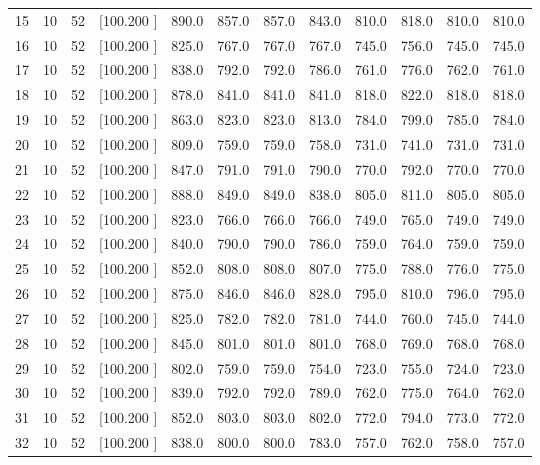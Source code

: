 \documentclass[12pt,a4paper]{article}
\begin{document}
\begin{center}
{\begin{tabular}{r r r r r r r r r r r r}
  15& 10& 52&[100.200   ]&   890.0&   857.0&   857.0&   843.0&   810.0&   818.0&   810.0&   810.0\\[-0.02in]
  16& 10& 52&[100.200   ]&   825.0&   767.0&   767.0&   767.0&   745.0&   756.0&   745.0&   745.0\\[-0.02in]
  17& 10& 52&[100.200   ]&   838.0&   792.0&   792.0&   786.0&   761.0&   776.0&   762.0&   761.0\\[-0.02in]
  18& 10& 52&[100.200   ]&   878.0&   841.0&   841.0&   841.0&   818.0&   822.0&   818.0&   818.0\\[-0.02in]
  19& 10& 52&[100.200   ]&   863.0&   823.0&   823.0&   813.0&   784.0&   799.0&   785.0&   784.0\\[-0.02in]
  20& 10& 52&[100.200   ]&   809.0&   759.0&   759.0&   758.0&   731.0&   741.0&   731.0&   731.0\\[-0.02in]
  21& 10& 52&[100.200   ]&   847.0&   791.0&   791.0&   790.0&   770.0&   792.0&   770.0&   770.0\\[-0.02in]
  22& 10& 52&[100.200   ]&   888.0&   849.0&   849.0&   838.0&   805.0&   811.0&   805.0&   805.0\\[-0.02in]
  23& 10& 52&[100.200   ]&   823.0&   766.0&   766.0&   766.0&   749.0&   765.0&   749.0&   749.0\\[-0.02in]
  24& 10& 52&[100.200   ]&   840.0&   790.0&   790.0&   786.0&   759.0&   764.0&   759.0&   759.0\\[-0.02in]
  25& 10& 52&[100.200   ]&   852.0&   808.0&   808.0&   807.0&   775.0&   788.0&   776.0&   775.0\\[-0.02in]
  26& 10& 52&[100.200   ]&   875.0&   846.0&   846.0&   828.0&   795.0&   810.0&   796.0&   795.0\\[-0.02in]
  27& 10& 52&[100.200   ]&   825.0&   782.0&   782.0&   781.0&   744.0&   760.0&   745.0&   744.0\\[-0.02in]
  28& 10& 52&[100.200   ]&   845.0&   801.0&   801.0&   801.0&   768.0&   769.0&   768.0&   768.0\\[-0.02in]
  29& 10& 52&[100.200   ]&   802.0&   759.0&   759.0&   754.0&   723.0&   755.0&   724.0&   723.0\\[-0.02in]
  30& 10& 52&[100.200   ]&   839.0&   792.0&   792.0&   789.0&   762.0&   775.0&   764.0&   762.0\\[-0.02in]
  31& 10& 52&[100.200   ]&   852.0&   803.0&   803.0&   802.0&   772.0&   794.0&   773.0&   772.0\\[-0.02in]
  32& 10& 52&[100.200   ]&   838.0&   800.0&   800.0&   783.0&   757.0&   762.0&   758.0&   757.0\\[-0.02in]

\end{tabular}}
\end{center}
\end{document}
